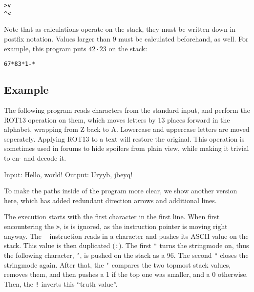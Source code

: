 \begin{lstlisting}
>v
^<
\end{lstlisting}

Note that as calculations operate on the stack, they must be written down in postfix notation. Values larger than 9 must be calculated beforehand, as well. For example, this program puts $42\cdot 23$ on the stack:

\begin{lstlisting}
67*83*1-*
\end{lstlisting}

\subsection{Example}

The following program reads characters from the standard input, and perform the ROT13 operation on them, which moves letters by 13 places forward in the alphabet, wrapping from Z back to A. Lowercase and uppercase letters are moved seperately. Applying ROT13 to a text will restore the original. This operation is sometimes used in forums to hide spoilers from plain view, while making it trivial to en- and decode it.



\begin{io}
Input: Hello, world!
Output: Uryyb, jbeyq!
\end{io}

To make the paths inside of the program more clear, we show another version here, which has added redundant direction arrows and additional lines.



The execution starts with the first character in the first line. When first encountering the \texttt{>}, is is ignored, as the instruction pointer is moving right anyway. The \texttt{~} instruction reads in a character and pushes its ASCII value on the stack. This value is then duplicated (\texttt{:}). The first \texttt{"} turns the stringmode on, thus the following character, \texttt{`}, is pushed on the stack as a 96. The second \texttt{"} closes the stringmode again. After that, the \texttt{`} compares the two topmost stack values, removes them, and then pushes a 1 if the top one was smaller, and a 0 otherwise. Then, the \texttt{!} inverts this “truth value”.

